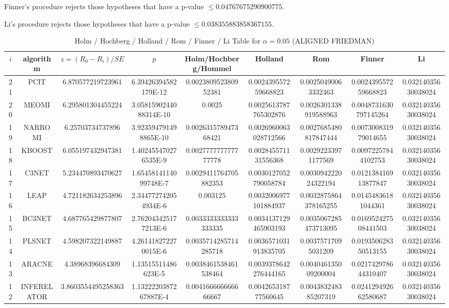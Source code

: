 \documentclass[a4paper,10pt]{article}
\begin{document}
\begin{landscape}
Finner's procedure rejects those hypotheses that have a p-value $\le0.04767675290900775$.


Li's procedure rejects those hypotheses that have a p-value $\le0.038355883858367155$.



\newpage

\begin{table}[!htp]
\centering\scriptsize
\caption{Holm / Hochberg / Holland / Rom / Finner / Li Table for $\alpha=0.05$ (ALIGNED FRIEDMAN)}
\begin{tabular}{ccccccccc}
$i$&algorithm&$z=(R_0 - R_i)/SE$&$p$&Holm/Hochberg/Hommel&Holland&Rom&Finner&Li\\
\hline
21&PCIT&6.870577219723961&6.39426394582179E-12&0.002380952380952381&0.002439557259668823&0.00250490063332463&0.002439557259668823&0.03214035630038024\\
20&MEOMI&6.295801304455224&3.0581590244088314E-10&0.0025&0.0025613787765302876&0.0026301338919588963&0.0048731630797145264&0.03214035630038024\\
19&NARROMI&6.25703734737896&3.923594791498865E-10&0.002631578947368421&0.0026960063028712566&0.0027685480817847444&0.007300831979014655&0.03214035630038024\\
18&KBOOST&6.055197432947381&1.402455470276535E-9&0.002777777777777778&0.002845571131556368&0.00292233971177569&0.00972257844102753&0.03214035630038024\\
17&C3NET&5.234470893470627&1.6545814114099748E-7&0.0029411764705882353&0.0030127052790058784&0.003094222024322194&0.012138416913877847&0.03214035630038024\\
16&LEAP&4.721182634253896&2.344772742054934E-6&0.003125&0.0032006977101884937&0.0032875864378165255&0.01454836181044361&0.03214035630038024\\
15&BC3NET&4.687765429877807&2.762043425177213E-6&0.0033333333333333335&0.0034137129465903193&0.0035067285473713095&0.016952427508441503&0.03214035630038024\\
14&PLSNET&4.598207322149887&4.261418272270015E-6&0.0035714285714285718&0.0036571031913835705&0.00375717095031209&0.019350628350513155&0.03214035630038024\\
13&ARACNE&4.38968396684309&1.13515511486623E-5&0.0038461538461538464&0.0039378642276444165&0.004046135009200004&0.021742978644310407&0.03214035630038024\\
12&INFERELATOR&3.8603554495258363&1.1322220387267887E-4&0.004166666666666667&0.004265318777560645&0.004383248385207319&0.024129492662580687&0.03214035630038024\\

\end{tabular}
\end{table}
\end{landscape}
\end{document}
